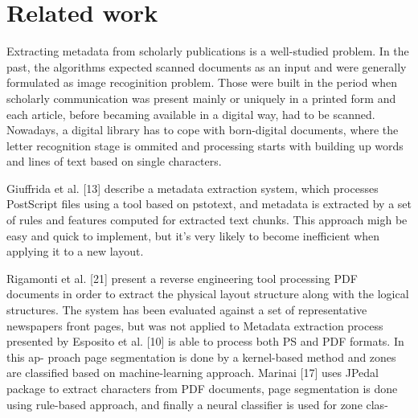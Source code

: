 \section{Related work}
Extracting metadata from scholarly publications is a well-studied problem. In the past, the algorithms expected scanned documents as an input and were generally formulated as image recoginition problem. Those were built in the period when scholarly communication was present mainly or uniquely in a printed form and each article, before becaming available in a digital way, had to be scanned.
Nowadays, a digital library has to cope with born-digital documents, where the letter recognition stage is ommited and processing starts with building up words and lines of text based on single characters.


Giuffrida et al. [13] describe a metadata extraction system, which processes PostScript files using a tool
based on pstotext, and metadata is extracted by a set of rules and features computed for extracted text chunks. This approach migh be easy and quick to implement, but it's very likely to become inefficient when applying it to a new layout.

Rigamonti et al. [21] present a reverse engineering tool processing PDF documents in order to extract the physical layout structure along with the logical structures. The system has been evaluated against a set of representative newspapers front pages, but was not applied to 
Metadata extraction process presented by Esposito et al. [10]
is able to process both PS and PDF formats. In this ap-
proach page segmentation is done by a kernel-based method
and zones are classified based on machine-learning approach.
Marinai [17] uses JPedal package to extract characters from
PDF documents, page segmentation is done using rule-based
approach, and finally a neural classifier is used for zone clas-